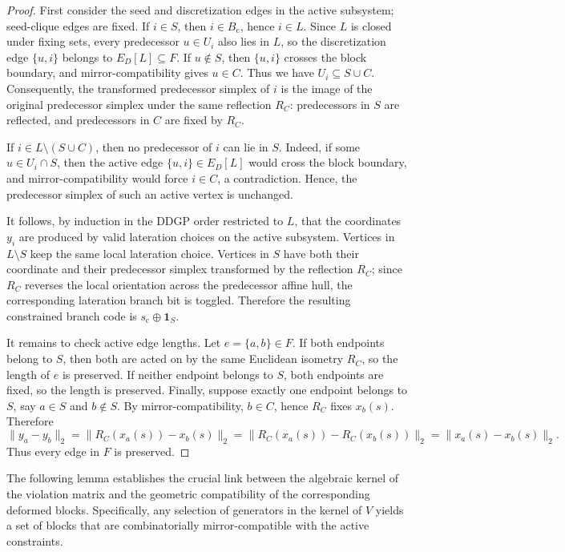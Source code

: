 \documentclass[11pt]{article}
\theoremstyle{plain}
\theoremstyle{definition}
\begin{document}
\begin{proof}
First consider the seed and discretization edges in the active subsystem; seed-clique edges are fixed. If $i\in S$, then $i\in B_{\mathrm{c}}$, hence $i\in L$. Since $L$ is closed under fixing sets, every predecessor $u\in U_i$ also lies in $L$, so the discretization edge $\{u,i\}$ belongs to $E_D[L]\subseteq F$. If $u\notin S$, then $\{u,i\}$ crosses the block boundary, and mirror-compatibility gives $u\in C$. Thus we have $U_i\subseteq S\cup C$. Consequently, the transformed predecessor simplex of $i$ is the image of the original predecessor simplex under the same reflection $R_C$: predecessors in $S$ are reflected, and predecessors in $C$ are fixed by $R_C$.

If $i\in L\setminus (S\cup C)$, then no predecessor of $i$ can lie in $S$. Indeed, if some $u\in U_i\cap S$, then the active edge $\{u,i\}\in E_D[L]$ would cross the block boundary, and mirror-compatibility would force $i\in C$, a contradiction. Hence, the predecessor simplex of such an active vertex is unchanged.

It follows, by induction in the DDGP order restricted to $L$, that the coordinates $y_i$ are produced by valid lateration choices on the active subsystem. Vertices in $L\setminus S$ keep the same local lateration choice. Vertices in $S$ have both their coordinate and their predecessor simplex transformed by the reflection $R_C$; since $R_C$ reverses the local orientation across the predecessor affine hull, the corresponding lateration branch bit is toggled. Therefore the resulting constrained branch code is $s_{\mathrm{c}}\oplus \mathbf{1}_S$.

It remains to check active edge lengths. Let $e=\{a,b\}\in F$. If both endpoints belong to $S$, then both are acted on by the same Euclidean isometry $R_C$, so the length of $e$ is preserved. If neither endpoint belongs to $S$, both endpoints are fixed, so the length is preserved. Finally, suppose exactly one endpoint belongs to $S$, say $a\in S$ and $b\notin S$. By mirror-compatibility, $b\in C$, hence $R_C$ fixes $x_b(s)$. Therefore
\[
\|y_a-y_b\|_2
=
\|R_C(x_a(s))-x_b(s)\|_2
=
\|R_C(x_a(s))-R_C(x_b(s))\|_2
=
\|x_a(s)-x_b(s)\|_2.
\]
Thus every edge in $F$ is preserved.
\end{proof}

The following lemma establishes the crucial link between the algebraic kernel of the violation matrix and the geometric compatibility of the corresponding deformed blocks. Specifically, any selection of generators in the kernel of $V$ yields a set of blocks that are combinatorially mirror-compatible with the active constraints.
\end{document}
